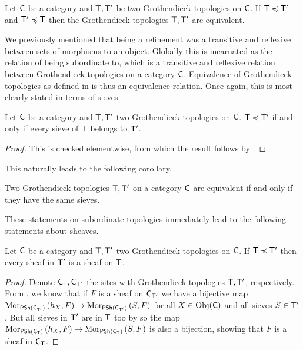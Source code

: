 \begin{definition}\label{def: equivalent topologies}
    Let $\mathsf{C}$ be a category and $\mathsf{T},\mathsf{T}'$ be two Grothendieck topologies on $\mathsf{C}$. If $\mathsf{T}\preccurlyeq\mathsf{T}'$ and $\mathsf{T}'\preccurlyeq\mathsf{T}$ then the Grothendieck topologies $\mathsf{T},\mathsf{T}'$ are equivalent. 
\end{definition}
We previously mentioned that being a refinement was a transitive and reflexive between sets of morphisms to an object. Globally this is incarnated as the relation of being subordinate to, which is a transitive and reflexive relation between Grothendieck topologies on a category $\mathsf{C}$. Equivalence of Grothendieck topologies as defined in  is thus an equivalence relation. Once again, this is most clearly stated in terms of sieves. 
\begin{proposition}\label{prop: sieves and subordinate topologies}
    Let $\mathsf{C}$ be a category and $\mathsf{T},\mathsf{T}'$ two Grothendieck topologies on $\mathsf{C}$. $\mathsf{T}\preccurlyeq\mathsf{T}'$ if and only if every sieve of $\mathsf{T}$ belongs to $\mathsf{T}'$. 
\end{proposition}
\begin{proof}
    This is checked elementwise, from which the result follows by .
\end{proof}
This naturally leads to the following corollary.
\begin{corollary}\label{corr: sieves and equivalent topologies}
    Two Grothendieck topologies $\mathsf{T},\mathsf{T}'$ on a category $\mathsf{C}$ are equivalent if and only if they have the same sieves. 
\end{corollary}
These statements on subordinate topologies immediately lead to the following statements about sheaves. 
\begin{proposition}\label{prop: refinements and sheaves on sites}
    Let $\mathsf{C}$ be a category and $\mathsf{T},\mathsf{T}'$ two Grothendieck topologies on $\mathsf{C}$. If $\mathsf{T}\preccurlyeq\mathsf{T}'$ then every sheaf in $\mathsf{T}'$ is a sheaf on $\mathsf{T}$. 
\end{proposition}
\begin{proof}
    Denote $\mathsf{C}_{\mathsf{T}},\mathsf{C}_{\mathsf{T}'}$ the sites with Grothendieck topologies $\mathsf{T},\mathsf{T}'$, respectively. From , we know that if $F$ is a sheaf on $\mathsf{C}_{\mathsf{T}'}$ we have a bijective map $\mathrm{Mor}_{\mathsf{PSh}(\mathsf{C}_{\mathsf{T}'})}\left(h_{X},F\right)\to\mathrm{Mor}_{\mathsf{PSh}(\mathsf{C}_{\mathsf{T}'})}\left(S,F\right)$ for all $X\in\mathrm{Obj}(\mathsf{C})$ and all sieves $S\in\mathsf{T}'$. But all sieves in $\mathsf{T}'$ are in $\mathsf{T}$ too by  so the map $\mathrm{Mor}_{\mathsf{PSh}(\mathsf{C}_{\mathsf{T}})}\left(h_{X},F\right)\to\mathrm{Mor}_{\mathsf{PSh}(\mathsf{C}_{\mathsf{T}})}\left(S,F\right)$ is also a bijection, showing that $F$ is a sheaf in $\mathsf{C}_{\mathsf{T}}$.  
\end{proof}
